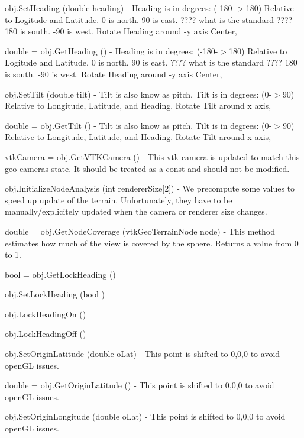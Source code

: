 \begin{DoxyItemize}
\item {\ttfamily obj.\-Set\-Heading (double heading)} -\/ Heading is in degrees\-: (-\/180-\/$>$180) Relative to Logitude and Latitude. 0 is north. 90 is east. ???? what is the standard ???? 180 is south. -\/90 is west. Rotate Heading around -\/y axis Center,  
\item {\ttfamily double = obj.\-Get\-Heading ()} -\/ Heading is in degrees\-: (-\/180-\/$>$180) Relative to Logitude and Latitude. 0 is north. 90 is east. ???? what is the standard ???? 180 is south. -\/90 is west. Rotate Heading around -\/y axis Center,  
\item {\ttfamily obj.\-Set\-Tilt (double tilt)} -\/ Tilt is also know as pitch. Tilt is in degrees\-: (0-\/$>$90) Relative to Longitude, Latitude, and Heading. Rotate Tilt around x axis,  
\item {\ttfamily double = obj.\-Get\-Tilt ()} -\/ Tilt is also know as pitch. Tilt is in degrees\-: (0-\/$>$90) Relative to Longitude, Latitude, and Heading. Rotate Tilt around x axis,  
\item {\ttfamily vtk\-Camera = obj.\-Get\-V\-T\-K\-Camera ()} -\/ This vtk camera is updated to match this geo cameras state. It should be treated as a const and should not be modified.  
\item {\ttfamily obj.\-Initialize\-Node\-Analysis (int renderer\-Size\mbox{[}2\mbox{]})} -\/ We precompute some values to speed up update of the terrain. Unfortunately, they have to be manually/explicitely updated when the camera or renderer size changes.  
\item {\ttfamily double = obj.\-Get\-Node\-Coverage (vtk\-Geo\-Terrain\-Node node)} -\/ This method estimates how much of the view is covered by the sphere. Returns a value from 0 to 1.  
\item {\ttfamily bool = obj.\-Get\-Lock\-Heading ()}  
\item {\ttfamily obj.\-Set\-Lock\-Heading (bool )}  
\item {\ttfamily obj.\-Lock\-Heading\-On ()}  
\item {\ttfamily obj.\-Lock\-Heading\-Off ()}  
\item {\ttfamily obj.\-Set\-Origin\-Latitude (double o\-Lat)} -\/ This point is shifted to 0,0,0 to avoid open\-G\-L issues.  
\item {\ttfamily double = obj.\-Get\-Origin\-Latitude ()} -\/ This point is shifted to 0,0,0 to avoid open\-G\-L issues.  
\item {\ttfamily obj.\-Set\-Origin\-Longitude (double o\-Lat)} -\/ This point is shifted to 0,0,0 to avoid open\-G\-L issues.  

\end{DoxyItemize}
